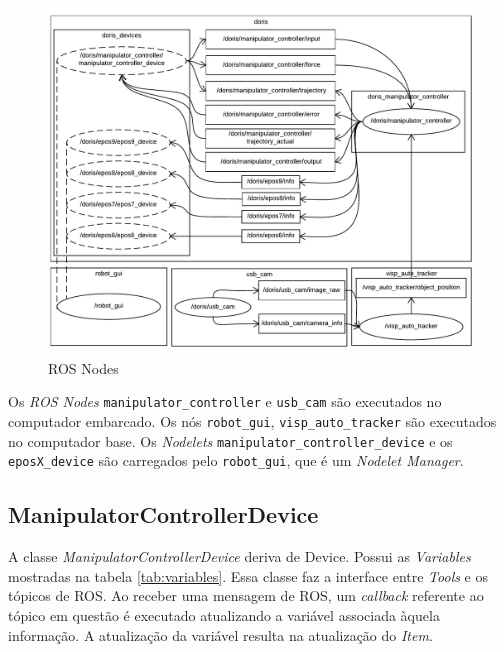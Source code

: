 \begin{figure}[!h]
  \centering
  \includegraphics[width=\linewidth]{./img/node_diagram}
  \caption{ROS Nodes}
  \label{fig:ros_nodes}
\end{figure}

Os \textit{ROS Nodes} \verb|manipulator_controller| e \verb|usb_cam| são executados no computador embarcado. Os nós \verb|robot_gui|, \verb|visp_auto_tracker| são executados no computador base. Os \textit{Nodelets} \verb|manipulator_controller_device| e os \verb|eposX_device| são carregados pelo \verb|robot_gui|, que é um \textit{Nodelet Manager}. 

\subsection{{ManipulatorControllerDevice}}

A classe \textit{ManipulatorControllerDevice} deriva de Device. Possui as \textit{Variables} mostradas na tabela \ref{tab:variables}. Essa classe faz a interface entre \textit{Tools} e os tópicos de ROS. Ao receber uma mensagem de ROS, um \textit{callback} referente ao tópico em questão é executado atualizando a variável associada àquela informação. A atualização da variável resulta na atualização do \textit{Item}.

